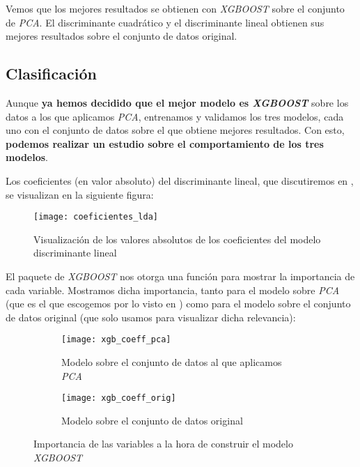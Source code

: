Vemos que los mejores resultados se obtienen con \textit{XGBOOST} sobre el conjunto de \textit{PCA}. El discriminante cuadrático y el discriminante lineal obtienen sus mejores resultados sobre el conjunto de datos original.

\subsection{Clasificación}

Aunque \textbf{ya hemos decidido que el mejor modelo es \textit{XGBOOST}} sobre los datos a los que aplicamos \textit{PCA}, entrenamos y validamos los tres modelos, cada uno con el conjunto de datos sobre el que obtiene mejores resultados. Con esto, \textbf{podemos realizar un estudio sobre el comportamiento de los tres modelos}.

Los coeficientes (en valor absoluto) del discriminante lineal, que discutiremos en , se visualizan en la siguiente figura:

\begin{figure}[H]
    \centering
    \texttt{[image: coeficientes\_lda]}
    \caption{Visualización de los valores absolutos de los coeficientes del modelo discriminante lineal}
\end{figure}

El paquete de \textit{XGBOOST} nos otorga una función para mostrar la importancia de cada variable. Mostramos dicha importancia, tanto para el modelo sobre \textit{PCA} (que es el que escogemos por lo visto en ) como para el modelo sobre el conjunto de datos original (que solo usamos para visualizar dicha relevancia):

\begin{figure}[H]
    \centering
    \begin{subfigure}{0.45\textwidth}
        \texttt{[image: xgb\_coeff\_pca]}
        \caption{Modelo sobre el conjunto de datos al que aplicamos \textit{PCA}}
    \end{subfigure}
    \begin{subfigure}{0.45\textwidth}
        \texttt{[image: xgb\_coeff\_orig]}
        \caption{Modelo sobre el conjunto de datos original}
    \end{subfigure}

    \caption{Importancia de las variables a la hora de construir el modelo \textit{XGBOOST}}
\end{figure}

